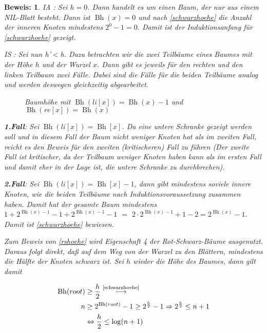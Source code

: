 \documentclass[ngerman,draft,parskip=half*,twoside]{scrreprt}
\theoremstyle{break}
\theoremstyle{nonumberbreak}
\newtheorem{beweis}{Beweis:}
\DeclareMathOperator{\Bh}{Bh}       %
\begin{document}
\begin{beweis} 
 IA : Sei $h=0$. Dann handelt es um einen Baum, der nur aus einem NIL-Blatt besteht. Dann ist $\Bh(x)=0$ und nach \autoref{schwarzhoehe} 
 die Anzahl der inneren Knoten mindestens $2^0-1=0$. Damit ist der Induktionsanfang für \autoref{schwarzhoehe} gezeigt. 
 
  IS : Sei nun h'$<$h. Dazu betrachten wir die zwei Teilbäume eines Baumes mit der Höhe $h$ und der Wurzel $x$.
Dann gibt es jeweils für den rechten und den linken Teilbaum zwei Fälle. Dabei sind die Fälle für die beiden Teilbäume analog und
 werden deswegen gleichzeitig abgearbeitet.

    \begin{figure}[H]
    \centering
    \caption{Baumhöhe mit $\Bh(li[x])=\Bh(x)-1$ und $\Bh(re[x])=\Bh(x)$}
    \label{241103d}
 \end{figure} 
 
    \textbf{1.Fall}:  Sei $\Bh(li[x]) = \Bh[x]$. Da eine untere Schranke gezeigt werden soll und in diesem Fall der Baum nicht weniger 
    Knoten
    hat als im zweiten Fall, reicht es den Beweis für den zweiten (kritischeren) Fall zu führen (Der zweite Fall ist kritischer, da
    der Teilbaum weniger Knoten haben kann als im ersten Fall und damit eher in der Lage ist, die untere Schranke zu durchbrechen).
     
    \textbf{2.Fall}:  Sei $\Bh(li[x]) = \Bh[x]-1$, dann gibt mindestens soviele innere Knoten, wie die beiden
    Teilbäume nach Induktionsvoraussetzung zusammen haben. Damit hat der gesamte Baum mindestens   
    $1+2^{\Bh(x)-1}-1+2^{\Bh(x)-1}-1$  $=$ $2 \cdot 2^{\Bh(x)-1}+1-2 = 2^{\Bh(x)}-1$. Damit ist \autoref{schwarzhoehe} bewiesen. 
    
Zum Beweis von \autoref{rshoehe} wird Eigenschaft 4 der Rot-Schwarz-Bäume ausgenutzt. Daraus folgt direkt, daß auf dem Weg von der Wurzel zu den Blättern,
mindestens die Hälfte der Knoten schwarz ist. Sei $h$ wieder die Höhe
des Baumes, dann gilt damit

\begin{align*}
  \Bh(root) &\geq\frac{h}{2}\stackrel{\text{\autoref{schwarzhoehe}}}{\longrightarrow}\\
  n &\geq 2^{\Bh(root)}-1 \geq 2^{\frac{h}{2}}-1 \Rightarrow 2^{\frac{h}{2}}\leq n+1\\
  &\Leftrightarrow \frac{h}{2}\leq \log(n+1)
\end{align*}
\end{beweis} 
\end{document}
